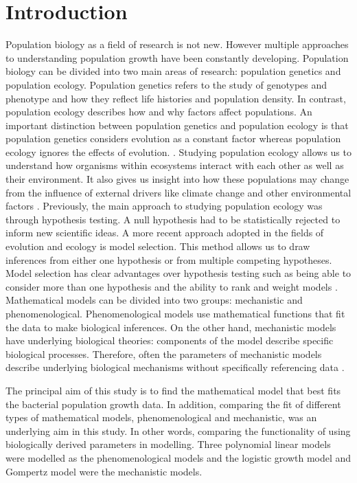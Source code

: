 \documentclass[11pt]{article}
\begin{document}
	\section{Introduction}
	Population biology as a field of research is not new. However multiple approaches to understanding population growth have been constantly developing. Population biology can be divided into two main areas of research: population genetics and population ecology. Population genetics refers to the study of genotypes and phenotype and how they reflect life histories and population density. In contrast, population ecology describes how and why factors affect populations. An important distinction between population genetics and population ecology is that population genetics considers evolution as a constant factor whereas population ecology ignores the effects of evolution. \citep{levins1966strategy}. Studying population ecology allows us to understand how organisms within ecosystems interact with each other as well as their environment. It also gives us insight into how these populations may change from the influence of external drivers like climate change and other environmental factors \citep{snider2013}. Previously, the main approach to studying population ecology was through hypothesis testing. A null hypothesis had to be statistically rejected to inform new scientific ideas. A more recent approach adopted in the fields of evolution and ecology is model selection. This method allows us to draw inferences from either one hypothesis or from multiple competing hypotheses. Model selection has clear advantages over hypothesis testing such as being able to consider more than one hypothesis and the ability to rank and weight models \citep{johnson2004model}. Mathematical models can be divided into two groups: mechanistic and phenomenological. Phenomenological models use mathematical functions that fit the data to make biological inferences. On the other hand, mechanistic models have underlying biological theories: components of the model describe specific biological processes. Therefore, often the parameters of mechanistic models describe underlying biological mechanisms without specifically referencing data \citep{white2019should}.
	
	The principal aim of this study is to find the mathematical model that best fits the bacterial population growth data. In addition, comparing the fit of different types of mathematical models, phenomenological and mechanistic, was an underlying aim in this study. In other words, comparing the functionality of using biologically derived parameters in modelling. Three polynomial linear models were modelled as the phenomenological models and the logistic growth model \citep{verhulst1838notice} and Gompertz model \citep{zwietering1990modeling} were the mechanistic models. 
	
\end{document}
